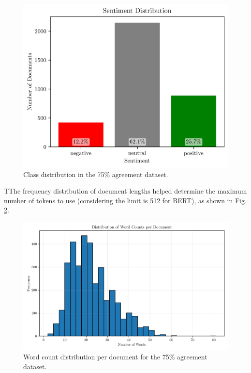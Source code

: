 \documentclass[conference]{IEEEtran}
\begin{document}
\begin{figure}[H]
    \centering
    \includegraphics[width=1\linewidth]{assets/sentiment_distribution.png}
    \caption{Class distribution in the 75\% agreement dataset.}
    \label{fig:sentiment_distribution}
\end{figure}

TThe frequency distribution of document lengths helped determine the maximum number of tokens to use (considering the limit is 512 for BERT), as shown in Fig. \ref{fig:word_count_distribution}.

\begin{figure}[H]
    \centering
    \includegraphics[width=1\linewidth]{assets/word_count_distribution.png}
    \caption{Word count distribution per document for the 75\% agreement dataset.}
    \label{fig:word_count_distribution}
\end{figure}
\end{document}
